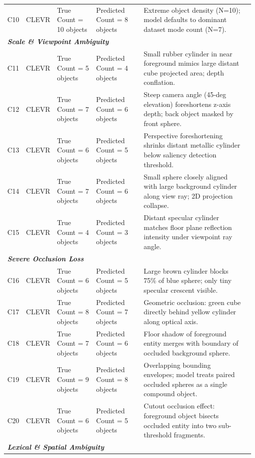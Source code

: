 \begin{table}[t]
\begin{tabular}{c l l p{3.2cm} p{3.2cm} p{4.8cm}}
C10 & CLEVR & True Count = 10 objects & Predicted Count = 8 objects & Extreme object density (N=10); model defaults to dominant dataset mode count (N=7). \\
\multicolumn{6}{l}{\textbf{\textit{Scale \& Viewpoint Ambiguity}}} \\ \midrule
C11 & CLEVR & True Count = 5 objects & Predicted Count = 4 objects & Small rubber cylinder in near foreground mimics large distant cube projected area; depth conflation. \\
C12 & CLEVR & True Count = 7 objects & Predicted Count = 6 objects & Steep camera angle (45-deg elevation) foreshortens z-axis depth; back object masked by front sphere. \\
C13 & CLEVR & True Count = 6 objects & Predicted Count = 5 objects & Perspective foreshortening shrinks distant metallic cylinder below saliency detection threshold. \\
C14 & CLEVR & True Count = 7 objects & Predicted Count = 6 objects & Small sphere closely aligned with large background cylinder along view ray; 2D projection collapse. \\
C15 & CLEVR & True Count = 4 objects & Predicted Count = 3 objects & Distant specular cylinder matches floor plane reflection intensity under viewpoint ray angle. \\
\multicolumn{6}{l}{\textbf{\textit{Severe Occlusion Loss}}} \\ \midrule
C16 & CLEVR & True Count = 6 objects & Predicted Count = 5 objects & Large brown cylinder blocks 75\% of blue sphere; only tiny specular crescent visible. \\
C17 & CLEVR & True Count = 8 objects & Predicted Count = 7 objects & Geometric occlusion: green cube directly behind yellow cylinder along optical axis. \\
C18 & CLEVR & True Count = 7 objects & Predicted Count = 6 objects & Floor shadow of foreground entity merges with boundary of occluded background sphere. \\
C19 & CLEVR & True Count = 9 objects & Predicted Count = 8 objects & Overlapping bounding envelopes; model treats paired occluded spheres as a single compound object. \\
C20 & CLEVR & True Count = 6 objects & Predicted Count = 5 objects & Cutout occlusion effect: foreground object bisects occluded entity into two sub-threshold fragments. \\
\multicolumn{6}{l}{\textbf{\textit{Lexical \& Spatial Ambiguity}}} \\ \midrule

\end{tabular}
\end{table}
